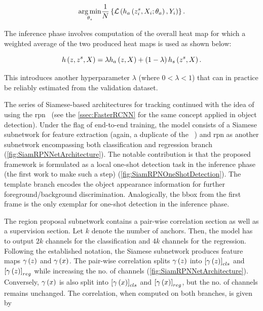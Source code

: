 \begin{equation}
    \label{eq:SNetModelTraining}
    \underset{\theta_s}{\operatorname*{arg\,min}}
    \frac{1}{N}
    \left\{ {
        {\mathcal{L}} \left( 
            {h_a} \left( {z}_{i}^{s}, X_i; \theta_a \right),
            Y_i
         \right)
    } \right\}.
\end{equation}

\noindent The inference phase involves computation of the overall heat map for which a weighted average of the two produced heat maps is used as shown below:

\begin{equation}
    {h} \left( z, z^s, X \right) = \lambda {h_a} \left( z, X \right) + \left( {1 - \lambda} \right) {h_s} \left( z^s, X \right).
\end{equation}

\noindent This introduces another hyperparameter $\lambda$ (where $0 < \lambda < 1$) that can in practice be reliably estimated from the validation dataset.

The series of Siamese-based architectures for tracking continued with the idea of using the \gls{rpn}~\cite{Li2018} (see the \cref{ssec:FasterRCNN} for the same concept applied in object detection). Under the flag of end-to-end training, the  model consists of a Siamese subnetwork for feature extraction (again, a duplicate of the ~\cite{Bertinetto2016}) and \gls{rpn} as another subnetwork encompassing both classification and regression branch (\cref{fig:SiamRPNNetArchitecture}). The notable contribution is that the proposed framework is formulated as a local one-shot detection task in the inference phase (the first work to make such a step) (\cref{fig:SiamRPNOneShotDetection}). The template branch encodes the object appearance information for further foreground/background discrimination. Analogically, the \gls{bbox} from the first frame is the only exemplar for one-shot detection in the inference phase.

The region proposal subnetwork contains a pair-wise correlation section as well as a supervision section. Let $k$ denote the number of anchors. Then, the model has to output $2k$ channels for the classification and $4k$ channels for the regression. Following the established notation, the Siamese subnetwork produces feature maps ${\gamma} \left( z \right)$ and ${\gamma} \left( x \right)$. The pair-wise correlation splits ${\gamma} \left( z \right)$ into $\left[ {{\gamma} \left( z \right)} \right]_{cls}$ and $\left[ {{\gamma} \left( z \right)} \right]_{reg}$ while increasing the no. of channels (\cref{fig:SiamRPNNetArchitecture}). Conversely, ${\gamma} \left( x \right)$ is also split into $\left[ {{\gamma} \left( x \right)} \right]_{cls}$ and $\left[ {{\gamma} \left( x \right)} \right]_{reg}$, but the no. of channels remains unchanged. The correlation, when computed on both branches, is given by

